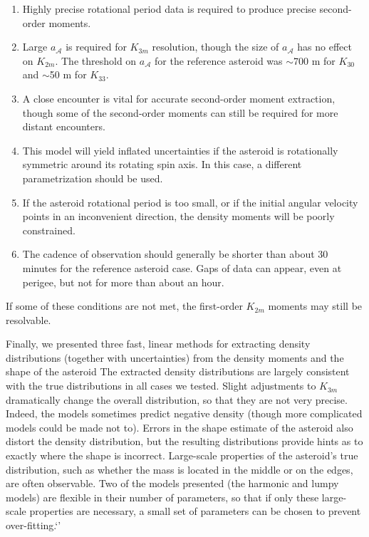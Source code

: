 \documentclass[fleqn,usenatbib]{mnras}
\begin{document}
\begin{enumerate}
  \item Highly precise rotational period data is required to produce precise second-order moments.
  \item Large $a_\mathcal{A}$ is required for $K_{3m}$ resolution, though the size of $a_\mathcal{A}$ has no effect on $K_{2m}$. The threshold on $a_\mathcal{A}$ for the reference asteroid was $\sim$700 m for $K_{30}$ and $\sim$50 m for $K_{33}$.
  \item A close encounter is vital for accurate second-order moment extraction, though some of the second-order moments can still be required for more distant encounters.
  \item This model will yield inflated uncertainties if the asteroid is rotationally symmetric around its rotating spin axis. In this case, a different parametrization should be used. 
  \item If the asteroid rotational period is too small, or if the initial angular velocity points in an inconvenient direction, the density moments will be poorly constrained.
  \item The cadence of observation should generally be shorter than about 30 minutes for the reference asteroid case. Gaps of data can appear, even at perigee, but not for more than about an hour.
\end{enumerate}


If some of these conditions are not met, the first-order $K_{2m}$ moments may still be resolvable.

Finally, we presented three fast, linear methods for extracting density distributions (together with uncertainties) from the density moments and the shape of the asteroid The extracted density distributions are largely consistent with the true distributions in all cases we tested. Slight adjustments to $K_{3m}$ dramatically change the overall distribution, so that they are not very precise. Indeed, the models sometimes predict negative density (though more complicated models could be made not to). Errors in the shape estimate of the asteroid also distort the density distribution, but the resulting distributions provide hints as to exactly where the shape is incorrect. Large-scale properties of the asteroid's true distribution, such as whether the mass is located in the middle or on the edges, are often observable. Two of the models presented (the harmonic and lumpy models) are flexible in their number of parameters, so that if only these large-scale properties are necessary, a small set of parameters can be chosen to prevent over-fitting.`'
\end{document}

